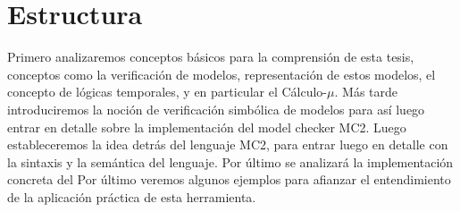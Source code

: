 \section{Estructura}
Primero analizaremos conceptos básicos para la comprensión de esta tesis, conceptos como la verificación de modelos, representación de estos modelos, el concepto de lógicas temporales, y en particular el Cálculo-$\mu$.
Más tarde introduciremos la noción de verificación simbólica de modelos para así luego entrar en detalle sobre la implementación del model checker MC2.
Luego estableceremos la idea detrás del lenguaje MC2, para entrar luego en detalle con la sintaxis y la semántica del lenguaje.
Por último se analizará la implementación concreta del 
Por último veremos algunos ejemplos para afianzar el entendimiento de la aplicación práctica de esta herramienta.


